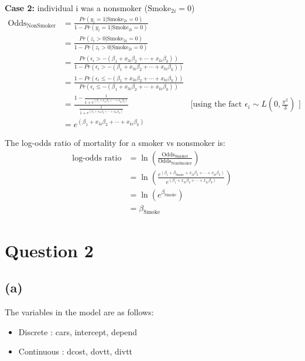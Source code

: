 \documentclass[a4paper]{article}
\begin{document}
\textbf{Case 2:} individual i was a nonsmoker (\(\text{Smoke}_{2i} = 0\))
\begin{align*}
    \text{Odds}_{\text{NonSmoker}} &= 
    \frac{Pr(y_{i} = 1 | \text{Smoke}_{2i}=0)}{1-Pr(y_{i} = 1 | \text{Smoke}_{2i}=0)}\\ 
    &=  \frac{Pr(z_{i} > 0 | \text{Smoke}_{2i}=0)}{1-Pr(z_{i} > 0 | \text{Smoke}_{2i}=0)}\\
    &= \frac{Pr(\epsilon_{i} > - (\beta_{1}  + x_{3i}\beta_{2} + \cdots + x_{ki}\beta_{k}))}{1-Pr(\epsilon_{i} > - (\beta_{1}  + x_{3i}\beta_{2} + \cdots + x_{ki}\beta_{k}))} \\
    &= \frac{1-Pr(\epsilon_{i} \leq - (\beta_{1} + x_{3i}\beta_{2} + \cdots + x_{ki}\beta_{k}))}{Pr(\epsilon_{i} \leq - (\beta_{1} + x_{3i}\beta_{2} + \cdots + x_{ki}\beta_{k}))} \\
    &= \frac{1 - \frac{1}{1+e^{(\beta_{1} + x_{3i}\beta_{2} + \cdots + x_{ki}\beta_{k})}}}{\frac{1}{1+e^{(\beta_{1}  + x_{3i}\beta_{2} + \cdots + x_{ki}\beta_{k})}}} & \text{[using the fact $\epsilon_{i} \sim L(0, \frac{\pi^2}{3})$ ]}\\
    &= e^{(\beta_{1} + x_{3i}\beta_{2} + \cdots + x_{ki}\beta_{k})}
\end{align*}

The log-odds ratio of mortality for a smoker vs nonsmoker is:
\begin{align*}
    \text{log-odds ratio} &= \ln ( \frac{\text{Odds}_{\text{Smoker}}}{\text{Odds}_{\text{NonSmoker}}} ) \\
    &= \ln (\frac{e^{(\beta_{1} + \beta_{\text{Smoke}} + x_{3i}\beta_{2} + \cdots + x_{ki}\beta_{k})}}{e^{(\beta_{1} + x_{3i}\beta_{2} + \cdots + x_{ki}\beta_{k})}}) \\
    &= \ln (e^{\beta_{\text{Smoke}}}) \\
    &= \beta_{\text{Smoke}}
\end{align*}


\pagebreak
\section*{Question 2}

\subsection*{(a)}

The variables in the model are as follows:

\begin{itemize}
    \item Discrete : cars, intercept, depend
    \item Continuous : dcost, dovtt, divtt
\end{itemize}
\end{document}
